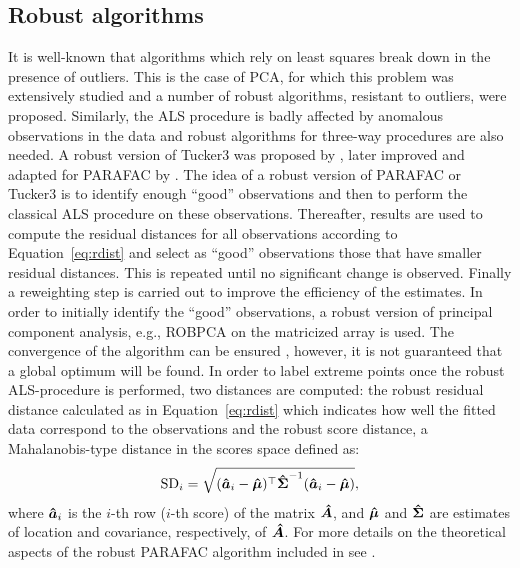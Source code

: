 \documentclass[article,shortnames, nojss]{jss}
\newcommand{\vv}[1]{\mbox{\boldmath$#1$}}
\begin{document}
\subsection{Robust algorithms}
\label{sec:robust}
It is well-known that algorithms which rely on least squares  break down
in the presence of outliers. This is the case of PCA, for which this problem was extensively
studied and a number of robust algorithms, resistant to outliers, were proposed. Similarly, the ALS procedure is badly affected by anomalous observations in the data and  robust algorithms  for three-way procedures are also needed. A robust version of Tucker3 was proposed by \citet{pravdova2001robust}, later improved and adapted for
PARAFAC by \citet{Engelen11}. The idea of a robust version of
PARAFAC or Tucker3 is to identify enough ``good'' observations and then to
perform the classical ALS procedure on these observations. Thereafter, results are used
to compute the residual distances for all
observations according to Equation~\ref{eq:rdist} and select as
``good'' observations those that have smaller residual distances.
This is repeated until no significant change is observed.
Finally a reweighting step is carried out to improve the efficiency
of the estimates. In order to initially identify  the ``good'' observations, a robust version of
principal component analysis, e.g., ROBPCA \citep{hubert-ROBPCA:2005, todorov-oof}
on the matricized array is used. The convergence of the algorithm can be
ensured \citep{Engelen11}, however, it is not guaranteed that
a global optimum will be found. In order to label extreme points once the robust ALS-procedure is performed, two distances are
computed: the robust residual distance calculated as in  Equation~\ref{eq:rdist} which  indicates how
well the fitted data correspond to the observations
and the robust score distance, a Mahalanobis-type distance in the scores space defined as:
\begin{equation}
\label{sdist}
\mbox{SD}_i = \sqrt{(\vv{\hat{a}}_i - \vv{\hat{\mu}}) ^\top \vv{\hat{\Sigma}}^{-1}(\vv{\hat{a}}_i - \vv{\hat{\mu}})},
\end{equation}
where $\vv{\hat{a}}_i$ is the $i$-th row ($i$-th score) of the matrix $\vv{\hat{A}}$, and
$\vv{\hat{\mu}}$ and $\vv{\hat{\Sigma}}$ are estimates of location and covariance, respectively,
of $\vv{\hat{A}}$.
For more details on the theoretical aspects of the robust PARAFAC algorithm included in  see \citet{Engelen11}.
\end{document}
